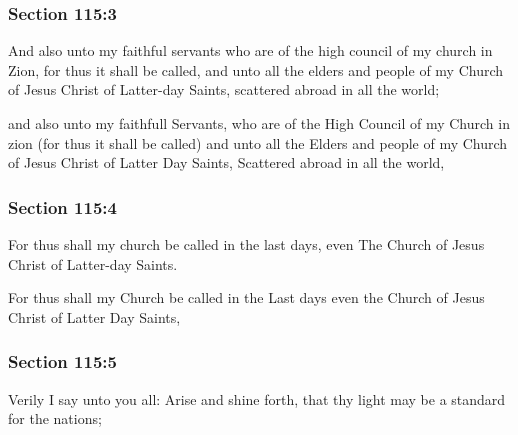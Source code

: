 	\subsubsection{Section 115:3} %
		\label{DC115-3}

		And also unto my faithful servants who are of the high council of my church in Zion, for thus it shall be called, and unto all the elders and people of my Church of Jesus Christ of Latter-day Saints, scattered abroad in all the world;

		\begin{framed}
		\scriptsize
			\begin{compactdesc}
				\item[JSP] and also unto my faithfull Servants, who are of the High Council of my Church in zion (for thus it shall be called) and unto all the Elders and people of my Church of Jesus Christ of Latter Day Saints, Scattered abroad in all the world,
			\end{compactdesc}
		\end{framed}

	\subsubsection{Section 115:4} %
		\label{DC115-4}

		For thus shall my church be called in the last days, even The Church of Jesus Christ of Latter-day Saints.

		\begin{framed}
		\scriptsize
			\begin{compactdesc}
				\item[JSP] For thus shall my Church be called in the Last days even the Church of Jesus Christ of Latter Day Saints,
			\end{compactdesc}
		\end{framed}

	\subsubsection{Section 115:5} %
		\label{DC115-5}

		Verily I say unto you all: Arise and shine forth, that thy light may be a standard for the nations;

